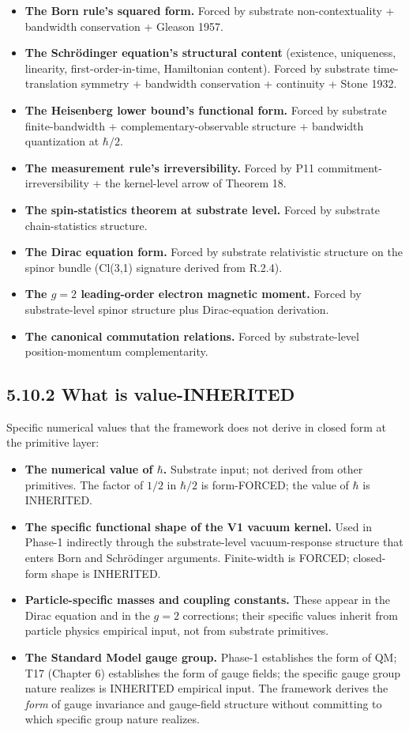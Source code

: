 \documentclass[11pt]{book}
\begin{document}
\begin{itemize}
\item \textbf{The Born rule's squared form.} Forced by substrate non-contextuality + bandwidth conservation + Gleason 1957.
\item \textbf{The Schrödinger equation's structural content} (existence, uniqueness, linearity, first-order-in-time, Hamiltonian content). Forced by substrate time-translation symmetry + bandwidth conservation + continuity + Stone 1932.
\item \textbf{The Heisenberg lower bound's functional form.} Forced by substrate finite-bandwidth + complementary-observable structure + bandwidth quantization at $\hbar/2$.
\item \textbf{The measurement rule's irreversibility.} Forced by P11 commitment-irreversibility + the kernel-level arrow of Theorem 18.
\item \textbf{The spin-statistics theorem at substrate level.} Forced by substrate chain-statistics structure.
\item \textbf{The Dirac equation form.} Forced by substrate relativistic structure on the spinor bundle (Cl(3,1) signature derived from R.2.4).
\item \textbf{The $g=2$ leading-order electron magnetic moment.} Forced by substrate-level spinor structure plus Dirac-equation derivation.
\item \textbf{The canonical commutation relations.} Forced by substrate-level position-momentum complementarity.
\end{itemize}

\subsection{5.10.2 What is value-INHERITED}

Specific numerical values that the framework does not derive in closed form at the primitive layer:

\begin{itemize}
\item \textbf{The numerical value of $\hbar$.} Substrate input; not derived from other primitives. The factor of $1/2$ in $\hbar/2$ is form-FORCED; the value of $\hbar$ is INHERITED.
\item \textbf{The specific functional shape of the V1 vacuum kernel.} Used in Phase-1 indirectly through the substrate-level vacuum-response structure that enters Born and Schrödinger arguments. Finite-width is FORCED; closed-form shape is INHERITED.
\item \textbf{Particle-specific masses and coupling constants.} These appear in the Dirac equation and in the $g=2$ corrections; their specific values inherit from particle physics empirical input, not from substrate primitives.
\item \textbf{The Standard Model gauge group.} Phase-1 establishes the form of QM; T17 (Chapter 6) establishes the form of gauge fields; the specific gauge group nature realizes is INHERITED empirical input. The framework derives the \textit{form} of gauge invariance and gauge-field structure without committing to which specific group nature realizes.
\end{itemize}
\end{document}
